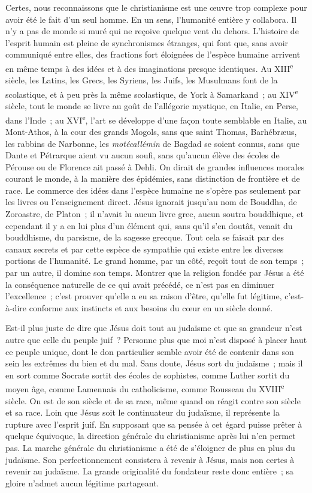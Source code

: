 \documentclass[french,twoside]{book} %
\begin{document}
Certes, nous reconnaissons que le christianisme est une œuvre trop complexe pour avoir été le fait d’un seul homme. En un sens, l’humanité entière y collabora. Il n’y a pas de monde si muré qui ne reçoive quelque vent du dehors. L’histoire de l’esprit humain est pleine de synchronismes étranges, qui font que, sans avoir communiqué entre elles, des fractions fort éloignées de l’espèce humaine arrivent en même temps à des idées et à des imaginations presque identiques. Au XIII\textsuperscript{e} siècle, les Latins, les Grecs, les Syriens, les Juifs, les Musulmans font de la scolastique, et à peu près la même scolastique, de York à Samarkand ; au XIV\textsuperscript{e} siècle, tout le monde se livre au goût de l’allégorie mystique, en Italie, en Perse, dans l’Inde ; au XVI\textsuperscript{e}, l’art se développe d’une façon toute semblable en Italie, au Mont-Athos, à la cour des grands Mogols, sans que saint Thomas, Barhébræus, les rabbins de Narbonne, les {\itshape motécallémin} de Bagdad se soient connus, sans que Dante et Pétrarque aient vu aucun soufi, sans qu’aucun élève des écoles de Pérouse ou de Florence ait passé à Dehli. On dirait de grandes influences morales courant le monde, à la manière des épidémies, sans distinction de frontière et de race. Le commerce des idées dans l’espèce humaine ne s’opère pas seulement par les livres ou l’enseignement direct. Jésus ignorait jusqu’au nom de Bouddha, de Zoroastre, de Platon ; il n’avait lu aucun livre grec, aucun soutra bouddhique, et cependant il y a en lui plus d’un élément qui, sans qu’il s’en doutât, venait du bouddhisme, du parsisme, de la sagesse grecque. Tout cela se faisait par des canaux secrets et par cette espèce de sympathie qui existe entre les diverses portions de l’humanité. Le grand homme, par un côté, reçoit tout de son temps ; par un autre, il domine son temps. Montrer que la religion fondée par Jésus a été la conséquence naturelle de ce qui avait précédé, ce n’est pas en diminuer l’excellence ; c’est prouver qu’elle a eu sa raison d’être, qu’elle fut légitime, c’est-à-dire conforme aux instincts et aux besoins du cœur en un siècle donné.\par
Est-il plus juste de dire que Jésus doit tout au judaïsme et que sa grandeur n’est autre que celle du peuple juif ? Personne plus que moi n’est disposé à placer haut ce peuple unique, dont le don particulier semble avoir été de contenir dans son sein les extrêmes du bien et du mal. Sans doute, Jésus sort du judaïsme ; mais il en sort comme Socrate sortit des écoles de sophistes, comme Luther sortit du moyen âge, comme Lamennais du catholicisme, comme Rousseau du XVIII\textsuperscript{e} siècle. On est de son siècle et de sa race, même quand on réagit contre son siècle et sa race. Loin que Jésus soit le continuateur du judaïsme, il représente la rupture avec l’esprit juif. En supposant que sa pensée à cet égard puisse prêter à quelque équivoque, la direction générale du christianisme après lui n’en permet pas. La marche générale du christianisme a été de s’éloigner de plus en plus du judaïsme. Son perfectionnement consistera à revenir à Jésus, mais non certes à revenir au judaïsme. La grande originalité du fondateur reste donc entière ; sa gloire n’admet aucun légitime partageant.\par
\end{document}
